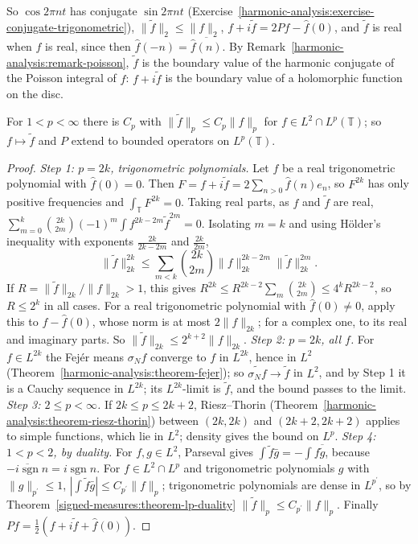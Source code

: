 So $\cos 2\pi nt$ has conjugate $\sin 2\pi nt$ (Exercise~\ref{harmonic-analysis:exercise-conjugate-trigonometric}), $\|\tilde f\|_2 \leq \|f\|_2$, $f + i\tilde f = 2Pf - \hat f(0)$, and $\tilde f$ is real when $f$ is real, since then
$\hat f(-n) = \overline{\hat f(n)}$. By Remark~\ref{harmonic-analysis:remark-poisson}, $\tilde f$ is the boundary value of the harmonic conjugate of the Poisson integral of $f$: $f + i\tilde f$ is the boundary value of a holomorphic
function on the disc.

\begin{theorem}[M.\ Riesz]\label{harmonic-analysis:theorem-riesz-conjugate}
For $1 < p < \infty$ there is $C_p$ with $\|\tilde f\|_p \leq C_p\|f\|_p$ for $f \in L^2 \cap L^p(\mathbb{T})$; so $f \mapsto \tilde f$ and $P$ extend to bounded operators on $L^p(\mathbb{T})$.
\end{theorem}

\begin{proof}
\emph{Step 1: $p = 2k$, trigonometric polynomials.} Let $f$ be a real trigonometric polynomial with $\hat f(0) = 0$. Then $F = f + i\tilde f = 2\sum_{n > 0}\hat f(n)e_n$, so $F^{2k}$ has only positive frequencies and
$\int_\mathbb{T}F^{2k} = 0$. Taking real parts, as $f$ and $\tilde f$ are real, $\sum_{m=0}^k\binom{2k}{2m}(-1)^m\int f^{2k-2m}\tilde f^{2m} = 0$. Isolating $m = k$ and using H\"older's inequality with exponents
$\frac{2k}{2k - 2m}$ and $\frac{2k}{2m}$,
\[
\|\tilde f\|_{2k}^{2k} \leq \sum_{m<k}\binom{2k}{2m}\|f\|_{2k}^{2k-2m}\|\tilde f\|_{2k}^{2m}.
\]
If $R = \|\tilde f\|_{2k}/\|f\|_{2k} > 1$, this gives $R^{2k} \leq R^{2k-2}\sum_m\binom{2k}{2m} \leq 4^kR^{2k-2}$, so $R \leq 2^k$ in all cases. For a real trigonometric polynomial with $\hat f(0) \neq 0$, apply this to
$f - \hat f(0)$, whose norm is at most $2\|f\|_{2k}$; for a complex one, to its real and imaginary parts. So $\|\tilde f\|_{2k} \leq 2^{k+2}\|f\|_{2k}$.
\emph{Step 2: $p = 2k$, all $f$.} For $f \in L^{2k}$ the Fej\'er means $\sigma_Nf$ converge to $f$ in $L^{2k}$, hence in $L^2$ (Theorem~\ref{harmonic-analysis:theorem-fejer}); so $\widetilde{\sigma_Nf} \to \tilde f$ in $L^2$, and by Step 1
it is a Cauchy sequence in $L^{2k}$; its $L^{2k}$-limit is $\tilde f$, and the bound passes to the limit.
\emph{Step 3: $2 \leq p < \infty$.} If $2k \leq p \leq 2k + 2$, Riesz--Thorin (Theorem~\ref{harmonic-analysis:theorem-riesz-thorin}) between $(2k, 2k)$ and $(2k + 2, 2k + 2)$ applies to simple functions, which lie in $L^2$; density gives
the bound on $L^p$.
\emph{Step 4: $1 < p < 2$, by duality.} For $f, g \in L^2$, Parseval gives $\int\tilde f\bar g = -\int f\overline{\tilde g}$, because $\overline{-i\operatorname{sgn}n} = i\operatorname{sgn}n$. For $f \in L^2 \cap L^p$ and trigonometric
polynomials $g$ with $\|g\|_{p^{\prime}} \leq 1$, $|\int\tilde f\bar g| \leq C_{p^{\prime}}\|f\|_p$; trigonometric polynomials are dense in $L^{p^{\prime}}$, so by Theorem~\ref{signed-measures:theorem-lp-duality}
$\|\tilde f\|_p \leq C_{p^{\prime}}\|f\|_p$. Finally $Pf = \frac12(f + i\tilde f + \hat f(0))$.
\end{proof}

